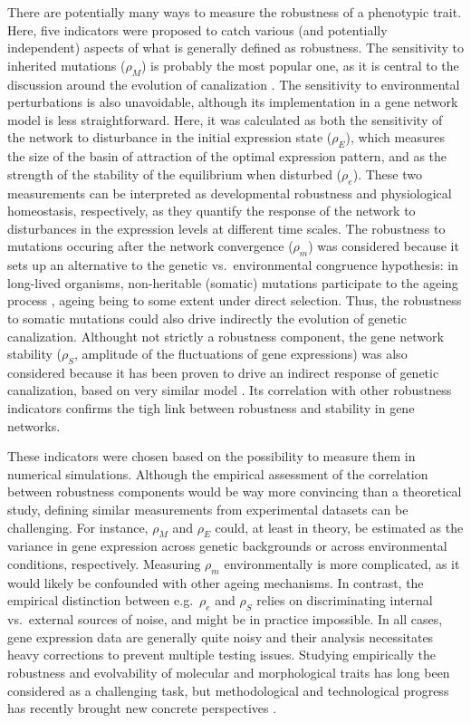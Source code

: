 \documentclass[10pt,a4paper]{article}
\newcommand{\stability}{{\rho_S}}
\newcommand{\earlyenv}{{\rho_E}}
\newcommand{\lateenv}{{\rho_e}}
\newcommand{\earlymut}{{\rho_M}}
\newcommand{\latemut}{{\rho_m}}
\begin{document}
There are potentially many ways to measure the robustness of a phenotypic trait. Here, five indicators were proposed to catch various (and potentially independent) aspects of what is generally defined as robustness. The sensitivity to inherited mutations ($\earlymut$) is probably the most popular one, as it is central to the discussion around the evolution of canalization \citep{Wad59, Wag96, Far15}. The sensitivity to environmental perturbations is also unavoidable, although its implementation in a gene network model is less straightforward. Here, it was calculated as both the sensitivity of the network to disturbance in the initial expression state ($\earlyenv$), which measures the size of the basin of attraction of the optimal expression pattern, and as the strength of the stability of the equilibrium when disturbed ($\lateenv$). These two measurements can be interpreted as developmental robustness and physiological homeostasis, respectively, as they quantify the response of the network to disturbances in the expression levels at different time scales. The robustness to mutations occuring after the network convergence ($\latemut$) was considered because it sets up an alternative to the genetic vs.\ environmental congruence hypothesis: in long-lived organisms, non-heritable (somatic) mutations participate to the ageing process \citep{KLH12}, ageing being to some extent under direct selection. Thus, the robustness to somatic mutations could also drive indirectly the evolution of genetic canalization. Althought not strictly a robustness component, the gene network stability ($\stability$, amplitude of the fluctuations of gene expressions) was also considered because it has been proven to drive an indirect response of genetic canalization, based on very similar model \citep{SB02}. Its correlation with other robustness indicators confirms the tigh link between robustness and stability in gene networks.

These indicators were chosen based on the possibility to measure them in numerical simulations. Although the empirical assessment of the correlation between robustness components would be way more convincing than a theoretical study, defining similar measurements from experimental datasets can be challenging. For instance, $\earlymut$ and $\earlyenv$ could, at least in theory, be estimated as the variance in gene expression across genetic backgrounds or across environmental conditions, respectively. Measuring $\latemut$ environmentally is more complicated, as it would likely be confounded with other ageing mechanisms. In contrast, the empirical distinction between e.g.\ $\lateenv$ and $\stability$ relies on discriminating internal vs.\ external sources of noise, and might be in practice impossible. In all cases, gene expression data are generally quite noisy and their analysis necessitates heavy corrections to prevent multiple testing issues. Studying empirically the robustness and evolvability of molecular and morphological traits has long been considered as a challenging task, but methodological and technological progress has recently brought new concrete perspectives \citep{PW19}. 
\end{document}

